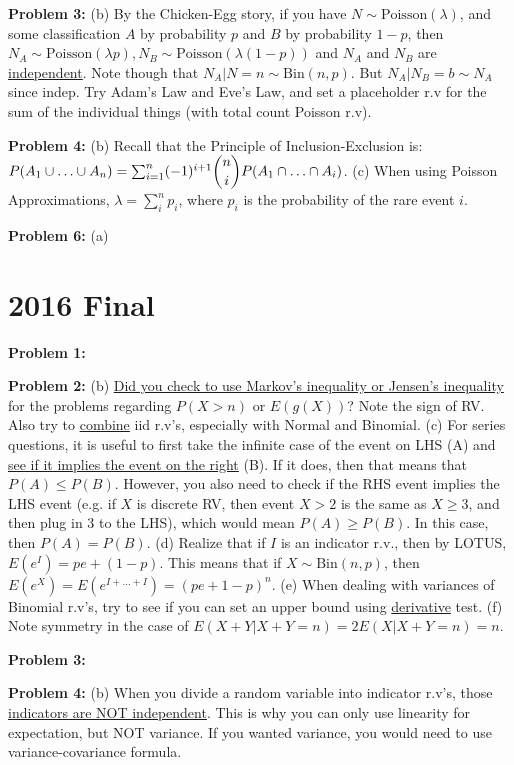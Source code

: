 \documentclass[letterpaper]{article}
\begin{document}
\noindent
\textbf{Problem 3:} (b) By the Chicken-Egg story, if you have $N \sim \mbox{Poisson}(\lambda)$, and some classification $A$ by probability $p$ and $B$ by probability $1-p$, then $N_A \sim \mbox{Poisson}(\lambda p), N_B \sim \mbox{Poisson}(\lambda (1-p))$ and $N_A$ and $N_B$ are \underline{independent}. Note though that $N_A | N = n \sim \mbox{Bin}(n, p)$. But $N_A | N_B = b \sim N_A$ since indep. Try Adam's Law and Eve's Law, and set a placeholder r.v for the sum of the individual things (with total count Poisson r.v).

\noindent
\textbf{Problem 4:} (b) Recall that the Principle of Inclusion-Exclusion is: $P(A_1 \cup \ldots \cup A_n) = \sum_{i=1}^{n} (-1)^{i+1} \dbinom{n}{i} P(A_1 \cap \ldots \cap A_i)$. (c) When using Poisson Approximations, $\lambda = \sum_{i}^{n} p_i$, where $p_i$ is the probability of the rare event $i$. 

\noindent
\textbf{Problem 6:} (a) 


\section*{2016 Final}
\noindent
\textbf{Problem 1:}

\noindent
\textbf{Problem 2:} (b) \underline{Did you check to use Markov's inequality or Jensen's inequality} for the problems regarding $P(X > n)$ or $E(g(X))$? Note the sign of RV. Also try to \underline{combine} iid r.v's, especially with Normal and Binomial. (c) For series questions, it is useful to first take the infinite case of the event on LHS (A) and \underline{see if it implies the event on the right} (B). If it does, then that means that $P(A) \leq P(B)$. However, you also need to check if the RHS event implies the LHS event (e.g. if $X$ is discrete RV, then event $X>2$ is the same as $X \geq 3$, and then plug in 3 to the LHS), which would mean $P(A) \geq P(B)$. In this case, then $P(A) = P(B)$. (d) Realize that if $I$ is an indicator r.v., then by LOTUS, \underline{$E(e^{I}) = pe + (1-p)$}. This means that if $X \sim \mbox{Bin}(n,p)$, then $E(e^{X}) = E(e^{I + \ldots + I}) = (pe + 1 - p)^n$. (e) When dealing with variances of Binomial r.v's, try to see if you can set an upper bound using \underline{derivative} test. (f) Note symmetry in the case of $E(X+Y|X+Y=n) = 2 E(X|X+Y=n) = n$.

\noindent
\textbf{Problem 3:}

\noindent
\textbf{Problem 4:} (b) When you divide a random variable into indicator r.v's, those \underline{indicators are NOT independent}. This is why you can only use linearity for expectation, but NOT variance. If you wanted variance, you would need to use variance-covariance formula. 
\end{document}
